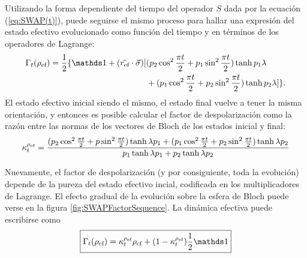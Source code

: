 Utilizando la forma dependiente del tiempo del operador $S$ dada por la ecuación (\ref{eq:SWAP(t)}), puede seguirse el mismo proceso para hallar una expresión del estado efectivo evolucionado como función del tiempo y en términos de los operadores de Lagrange:
\begin{align}
  \begin{split}
  \Gamma_{t}(\rho_{\ef})=\frac{1}{2}\{\Id+(\hat{r_{\ef}}\cdot\vec{\sigma})[&(p_{2}\cos^{2}{\frac{\pi t}{2}}+p_{1}\sin^{2}{\frac{\pi t}{2}})\tanh{p_{1}\lambda}\\
  &+(p_{1}\cos^{2}{\frac{\pi t}{2}}+p_{2}\sin^{2}{\frac{\pi t}{2}})\tanh{p_{2}\lambda}]\}.
  \end{split}
\end{align}
El estado efectivo inicial siendo el mismo, el estado final vuelve a tener la misma orientación, y entonces es posible calcular el factor de despolarización como la razón entre las normas de los vectores de Bloch de los estados inicial y final:
\begin{equation}\label{eq:SWAPFactort}
  \kappa_{t}^{\rho_{\text{ef}}}=\frac{(p_{2}\cos^{2}{\frac{\pi t}{2}}+p\sin^{2}{\frac{\pi t}{2}})\tanh{\lambda p_{1}}+(p_{1}\cos^{2}{\frac{\pi t}{2}}+p_{2}\sin^{2}{\frac{\pi t}{2}})\tanh{\lambda p_{2}}}{
    p_{1}\tanh{\lambda p_{1}}+p_{2}\tanh{\lambda p_{2}}}
\end{equation}

Nuevamente, el factor de despolarización (y por consiguiente, toda la evolución) depende de la pureza del estado efectivo incial, codificada en los multiplicadores de Lagrange. El efecto gradual de la evolución sobre la esfera de Bloch puede verse en la figura \ref{fig:SWAPFactorSequence}. La dinámica efectiva puede escribirse como
\begin{equation}\label{eq:EffectiveSWAPt}
  \boxed{\Gamma_{t}(\rho_{\ef})=\kappa_{t}^{\rho_{\ef}}\rho_{\ef}+(1-\kappa_{t}^{\rho_{\ef}})\frac{1}{2}\Id}
\end{equation}

